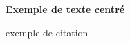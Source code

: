 \documentclass[10pt,a4paper]{article}
\begin{document}
	\begin{center}
		{\Large \textbf{Exemple de texte centré}}
	\end{center}
	\cite{ADN_RF} exemple de citation
	
	\nocite{*}
	
	
\end{document}
